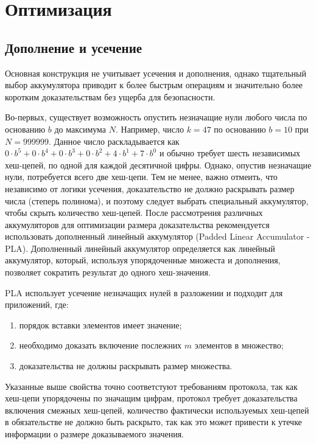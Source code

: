\section{Оптимизация}
\subsection{Дополнение и усечение}
Основная конструкция не учитывает усечения и дополнения, однако тщательный выбор аккумулятора приводит к более быстрым операциям и значительно более коротким доказательствам без ущерба для безопасности.

Во-первых, существует возможность опустить незначащие нули любого числа по основанию $b$ до максимума $N$.
Например, число $k = 47$ по основанию $b = 10$ при $N = 999999$.
Данное число раскладывается как $0 \cdot b^5 + 0 \cdot b^4 + 0 \cdot b^3 + 0 \cdot b^2 + 4 \cdot b^1 + 7 \cdot b^0$ и обычно требует шесть независимых хеш-цепей, по одной для каждой десятичной цифры.
Однако, опустив незначащие нули, потребуется всего две хеш-цепи.
Тем не менее, важно отмеить, что независимо от логики усечения, доказательство не должно раскрывать размер числа (степерь полинома), и поэтому следует выбрать специальный аккумулятор, чтобы скрыть количество хеш-цепей. После рассмотрения различных аккумуляторов для оптимизации размера доказательства рекомендуется использовать дополненный линейный аккумулятор (Padded Linear Accumulator - PLA).
Дополненный линейный аккумулятор определяется как линейный аккумулятор, который, используя упорядоченные множеста и дополнения, позволяет сократить результат до одного хеш-значения.

PLA использует усечение незначащих нулей в разложении и подходит для приложений, где:
\begin{enumerate}
	\item порядок вставки элементов имеет значение;
	\item необходимо доказать включение послежних $m$ элементов в множество;
	\item доказательства не должны раскрывать размер множества.
\end{enumerate}
Указанные выше свойства точно соответстуют требованиям протокола, так как хеш-цепи упорядочены по значащим цифрам, протокол требует доказательства включения смежных хеш-цепей, количество фактически используемых хеш-цепей в обязательстве не должно быть раскрыто, так как это может привести к утечке информации о размере доказываемого значения.

